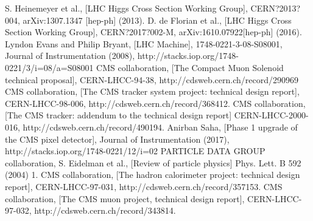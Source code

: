 \begin{thebibliography}{999}
		 S. Heinemeyer et al., [LHC Higgs Cross Section Working Group], CERN?2013?004, arXiv:1307.1347 [hep-ph] (2013).
		 D. de Florian et al., [LHC Higgs Cross Section Working Group], CERN?2017?002-M, arXiv:1610.07922[hep-ph] (2016).
		 Lyndon Evans and Philip Bryant, [LHC Machine], 1748-0221-3-08-S08001, Journal of Instrumentation (2008), http://stacks.iop.org/1748-0221/3/i=08/a=S08001
		 CMS collaboration, [The Compact Muon Solenoid technical proposal], CERN-LHCC-94-38, http://cdsweb.cern.ch/record/290969
		  CMS collaboration, [The CMS tracker system project: technical design report], CERN-LHCC-98-006, http://cdsweb.cern.ch/record/368412.
		  CMS collaboration, [The CMS tracker: addendum to the technical design report] CERN-LHCC-2000-016, http://cdsweb.cern.ch/record/490194.
		 Anirban Saha, [Phase 1 upgrade of the CMS pixel detector], Journal of Instrumentation (2017), http://stacks.iop.org/1748-0221/12/i=02
		 PARTICLE DATA GROUP collaboration, S. Eidelman et al., [Review of particle physics] Phys. Lett. B 592 (2004) 1.
		  CMS collaboration, [The hadron calorimeter project: technical design report], CERN-LHCC-97-031, http://cdsweb.cern.ch/record/357153.
		 CMS collaboration, [The CMS muon project, technical design report], CERN-LHCC-97-032, http://cdsweb.cern.ch/record/343814.
				
           	  
	 
	 \end{thebibliography}
\clearpage{\pagestyle{empty}\cleardoublepage}